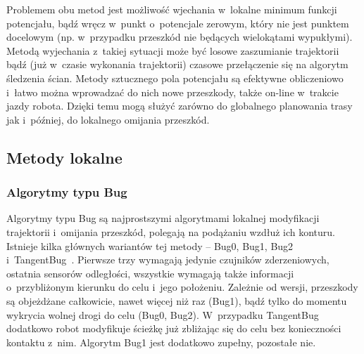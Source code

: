Problemem obu metod jest możliwość
wjechania w~lokalne minimum funkcji potencjału, bądź wręcz w~punkt o~potencjale zerowym,
który nie jest punktem docelowym (np. w~przypadku przeszkód nie będących wielokątami
wypukłymi). Metodą wyjechania z~takiej sytuacji może być losowe zaszumianie trajektorii
bądź (już w~czasie wykonania trajektorii) czasowe przełączenie się na algorytm śledzenia
ścian. Metody sztucznego pola potencjału są efektywne obliczeniowo i~łatwo można wprowadzać
do nich nowe przeszkody, także on-line w~trakcie jazdy robota. Dzięki temu mogą służyć
zarówno do globalnego planowania trasy jak i~później, do lokalnego omijania przeszkód.

\subsection{Metody lokalne}

\subsubsection{Algorytmy typu Bug}

Algorytmy typu Bug są najprostszymi algorytmami lokalnej modyfikacji
trajektorii i~omijania przeszkód, polegają na podążaniu wzdłuż ich konturu.
Istnieje kilka głównych wariantów tej metody -- Bug0, Bug1, Bug2 i~TangentBug~\cite{lumelsky1986dynamic}.
Pierwsze trzy wymagają jedynie czujników zderzeniowych, ostatnia sensorów odległości,
wszystkie wymagają także informacji o~przybliżonym kierunku do celu i~jego położeniu.
Zależnie od wersji, przeszkody są objeżdżane całkowicie, nawet więcej niż raz (Bug1),
bądź tylko do momentu wykrycia wolnej drogi do celu (Bug0, Bug2). W~przypadku TangentBug
dodatkowo robot modyfikuje ścieżkę już zbliżając się do celu bez konieczności kontaktu
z~nim. Algorytm Bug1 jest dodatkowo zupełny, pozostałe nie.

